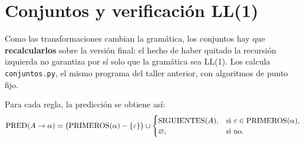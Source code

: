 \documentclass[12pt,letterpaper]{article}
\newcommand{\tk}[1]{\texttt{#1}}
\newcommand{\prim}{\textup{PRIMEROS}}
\newcommand{\sig}{\textup{SIGUIENTES}}
\newcommand{\pred}{\textup{PRED}}
\begin{document}
\section{Conjuntos y verificación LL(1)}

Como las transformaciones cambian la gramática, los conjuntos hay que \textbf{recalcularlos} sobre la versión final: el hecho de haber quitado la recursión izquierda no garantiza por sí solo que la gramática sea LL(1). Los calcula \tk{conjuntos.py}, el mismo programa del taller anterior, con algoritmos de punto fijo.

Para cada regla, la predicción se obtiene así:
{\small
\[
\pred(A \rightarrow \alpha) = \big(\prim(\alpha) - \{\varepsilon\}\big) \cup
\begin{cases}
\sig(A), & \text{si } \varepsilon \in \prim(\alpha),\\
\varnothing, & \text{si no.}
\end{cases}
\]}
\end{document}

